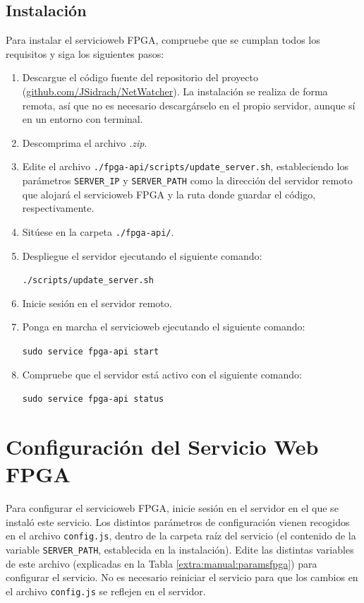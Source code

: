 \subsection*{Instalación}
Para instalar el \gls{servicioweb} \gls{FPGA}, compruebe que se cumplan todos los requisitos y siga los siguientes pasos:
\begin{enumerate}
  \item Descargue el código fuente del repositorio del proyecto (\href{https://github.com/JSidrach/NetWatcher/archive/master.zip}{\footnotesize{github.com/JSidrach/NetWatcher}}). La instalación se realiza de forma remota, así que no es necesario descargárselo en el propio servidor, aunque sí en un entorno con terminal.
  \item Descomprima el archivo \textit{.zip}.
  \item Edite el archivo \texttt{./fpga-api/scripts/update\_server.sh}, estableciendo los parámetros \texttt{SERVER\_IP} y \texttt{SERVER\_PATH} como la dirección del servidor remoto que alojará el \gls{servicioweb} \gls{FPGA} y la ruta donde guardar el código, respectivamente.
  \item Sitúese en la carpeta \texttt{./fpga-api/}.
  \item Despliegue el servidor ejecutando el siguiente comando:
  
  \texttt{./scripts/update\_server.sh}
  \item Inicie sesión en el servidor remoto.
  \item Ponga en marcha el \gls{servicioweb} ejecutando el siguiente comando:

  \texttt{sudo service fpga-api start}
  \item Compruebe que el servidor está activo con el siguiente comando:

  \texttt{sudo service fpga-api status}
\end{enumerate}


\section{Configuración del Servicio Web FPGA\label{extra:manual:configfpga}}
Para configurar el \gls{servicioweb} \gls{FPGA}, inicie sesión en el servidor en el que se instaló este servicio. Los distintos parámetros de configuración vienen recogidos en el archivo \texttt{config.js}, dentro de la carpeta raíz del servicio (el contenido de la variable \texttt{SERVER\_PATH}, establecida en la instalación). Edite las distintas variables de este archivo (explicadas en la Tabla \ref{extra:manual:paramsfpga}) para configurar el servicio. No es necesario reiniciar el servicio para que los cambios en el archivo \texttt{config.js} se reflejen en el servidor.

